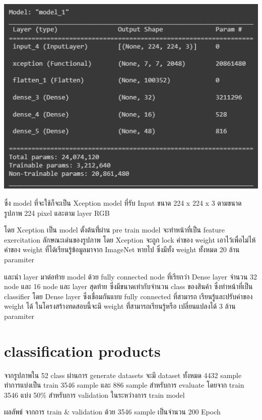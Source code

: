 \begin{center}
  \includegraphics[scale=0.45]{pic/model/model.png}
\end{center}
  
ซึ่ง model ที่จะใช้ก็จะเป็น Xception model ที่รับ Input ขนาด 224 x 224 x 3 ตามขนาดรูปภาพ 224 pixel และตาม layer RGB

โดย Xception เป็น model ตั้งต้นที่่ผ่าน pre train model จะทำหน้าที่เป็น feature exercitation ลักษณะเด่นของรูปภาพ
โดย Xception จะถูก lock ค่าของ weight เอาไว้เพื่อไม่ไห้ค่าของ weight ที่ได้เรียนรู้ข้อมูลมาจาก ImageNet หายไป  ซึ่งมีทั้ง weight ทั้งหมด 20 ล้าน paramiter

 และนำ layer มาต่อท้าย model ด้วย fully connected node ที่เรียกว่า Dense layer จำนวน 32 node และ 16 node และ 
layer สุดท้าย ซึ่งมีขนาดเท่ากับจำนวน class ของสินค้า ซึ่งทำหน้าที่เป็น classifier
โดย Dense layer ซึ่งเชื่อมกันแบบ fully connected ที่สามารถ เรียนรู้และปรับค่าของ weight ได้
ในโครงสร้างทดสอบนี้จะมี weight ที่่สามารถเรียนรู้หรือ เปลี่ยนแปลงได้ 3 ล้าน paramiter
   

\section{classification products}
จากรูปภาพใน 52 class ผ่านการ generate datasets จะมี dataset ทั้งหมด 4432 sample
 ทำการแบ่งเป็น train 3546 sample และ  886 sample สำหรับการ evaluate 
โดยจาก train 3546 แบ่ง 50\% สำหรับการ validation ในระหว่างการ train model

\par ผลลัพธ์ จากการ train \& validation ด้วย 3546 sample เป็นจำนวน 200 Epoch

